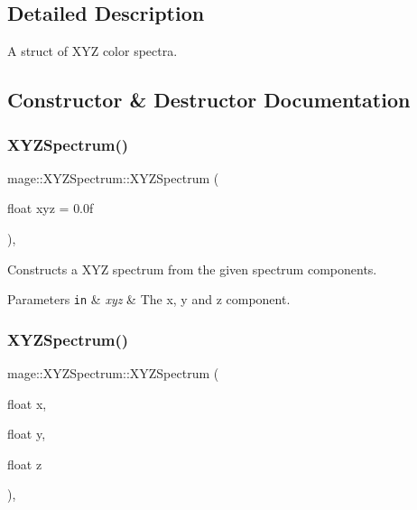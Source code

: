 \subsection{Detailed Description}
A struct of X\+YZ color spectra. 

\subsection{Constructor \& Destructor Documentation}
\hypertarget{structmage_1_1_x_y_z_spectrum_a8bb2d4458b86f430258f554b8f4ae9f2}{}\label{structmage_1_1_x_y_z_spectrum_a8bb2d4458b86f430258f554b8f4ae9f2} 
\subsubsection{\texorpdfstring{X\+Y\+Z\+Spectrum()}{XYZSpectrum()}\hspace{0.1cm}{\footnotesize\ttfamily [1/8]}}
{\footnotesize\ttfamily mage\+::\+X\+Y\+Z\+Spectrum\+::\+X\+Y\+Z\+Spectrum (\begin{DoxyParamCaption}\item[{float}]{xyz = {\ttfamily 0.0f} }\end{DoxyParamCaption})\hspace{0.3cm}{\ttfamily [explicit]}, {\ttfamily [noexcept]}}

Constructs a X\+YZ spectrum from the given spectrum components.


\begin{DoxyParams}[1]{Parameters}
\mbox{\tt in}  & {\em xyz} & The x, y and z component. \\
\hline
\end{DoxyParams}
\hypertarget{structmage_1_1_x_y_z_spectrum_a7e3d8b599655bf3ef54388a792eb4ace}{}\label{structmage_1_1_x_y_z_spectrum_a7e3d8b599655bf3ef54388a792eb4ace} 
\subsubsection{\texorpdfstring{X\+Y\+Z\+Spectrum()}{XYZSpectrum()}\hspace{0.1cm}{\footnotesize\ttfamily [2/8]}}
{\footnotesize\ttfamily mage\+::\+X\+Y\+Z\+Spectrum\+::\+X\+Y\+Z\+Spectrum (\begin{DoxyParamCaption}\item[{float}]{x,  }\item[{float}]{y,  }\item[{float}]{z }\end{DoxyParamCaption})\hspace{0.3cm}{\ttfamily [explicit]}, {\ttfamily [noexcept]}}

